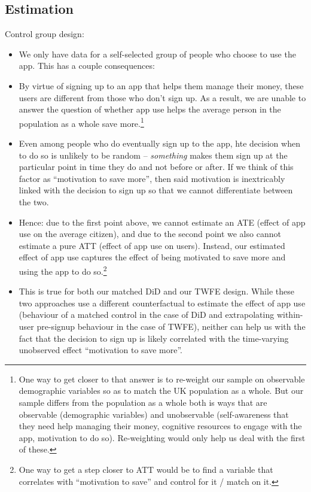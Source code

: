 \subsection{Estimation}%
\label{sub:difference_in_difference}

Control group design:
\begin{itemize}

    \item We only have data for a self-selected group of people who choose to
        use the app. This has a couple consequences:

    \item By virtue of signing up to an app that helps them manage
        their money, these users are different from those who don't
        sign up. As a result, we are unable to answer the question of
        whether app use helps the average person in the
        population as a whole save more.\footnote{One way to get closer
            to that answer is to re-weight our sample on observable
            demographic variables so as to match the UK population as a
            whole. But our sample differs from the population as a
            whole both is ways that are observable (demographic
            variables) and unobservable (self-awareness that they need
            help managing their money, cognitive resources to engage
            with the app, motivation to do so). Re-weighting would only
            help us deal with the first of these.}

    \item Even among people who do eventually sign up to the app,
        hte decision when to do so is unlikely to be random --
        \textit{something} makes them sign up at the particular
        point in time they do and not before or after. If we think
        of this factor as ``motivation to save more'', then said
        motivation is inextricably linked with the decision to sign
        up so that we cannot differentiate between the two.

    \item Hence: due to the first point above, we cannot estimate
        an ATE (effect of app use on the average citizen), and due
        to the second point we also cannot estimate a pure ATT
        (effect of app use on users). Instead, our estimated effect
        of app use captures the effect of being motivated to save
        more and using the app to do so.\footnote{One way to get a
            step closer to ATT would be to find a variable that
        correlates with ``motivation to save'' and control for it /
    match on it.}

    \item This is true for both our matched DiD and our TWFE
        design. While these two approaches use a different
        counterfactual to estimate the effect of app use
        (behaviour of a matched control in the case of DiD and
        extrapolating within-user pre-signup behaviour in the case
        of TWFE), neither can help us with the fact that the
        decision to sign up is likely correlated with the
        time-varying unobserved effect ``motivation to save more''.

\end{itemize}

